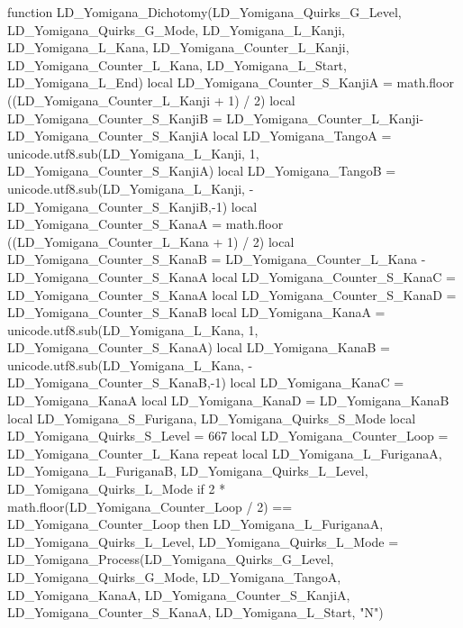{	function LD_Yomigana_Dichotomy(LD_Yomigana_Quirks_G_Level, LD_Yomigana_Quirks_G_Mode, LD_Yomigana_L_Kanji, LD_Yomigana_L_Kana, LD_Yomigana_Counter_L_Kanji, LD_Yomigana_Counter_L_Kana, LD_Yomigana_L_Start, LD_Yomigana_L_End)		
		local LD_Yomigana_Counter_S_KanjiA = math.floor ((LD_Yomigana_Counter_L_Kanji + 1) / 2)
		local LD_Yomigana_Counter_S_KanjiB = LD_Yomigana_Counter_L_Kanji-LD_Yomigana_Counter_S_KanjiA
		local LD_Yomigana_TangoA = unicode.utf8.sub(LD_Yomigana_L_Kanji, 1, LD_Yomigana_Counter_S_KanjiA)
		local LD_Yomigana_TangoB = unicode.utf8.sub(LD_Yomigana_L_Kanji, -LD_Yomigana_Counter_S_KanjiB,-1)
		local LD_Yomigana_Counter_S_KanaA = math.floor ((LD_Yomigana_Counter_L_Kana + 1) / 2)
		local LD_Yomigana_Counter_S_KanaB = LD_Yomigana_Counter_L_Kana - LD_Yomigana_Counter_S_KanaA
		local LD_Yomigana_Counter_S_KanaC = LD_Yomigana_Counter_S_KanaA
		local LD_Yomigana_Counter_S_KanaD = LD_Yomigana_Counter_S_KanaB
		local LD_Yomigana_KanaA = unicode.utf8.sub(LD_Yomigana_L_Kana, 1, LD_Yomigana_Counter_S_KanaA)
		local LD_Yomigana_KanaB = unicode.utf8.sub(LD_Yomigana_L_Kana, -LD_Yomigana_Counter_S_KanaB,-1)
		local LD_Yomigana_KanaC = LD_Yomigana_KanaA
		local LD_Yomigana_KanaD = LD_Yomigana_KanaB
		local LD_Yomigana_S_Furigana, LD_Yomigana_Quirks_S_Mode
		local LD_Yomigana_Quirks_S_Level = 667
		local LD_Yomigana_Counter_Loop = LD_Yomigana_Counter_L_Kana 
		repeat 
			local LD_Yomigana_L_FuriganaA, LD_Yomigana_L_FuriganaB, LD_Yomigana_Quirks_L_Level, LD_Yomigana_Quirks_L_Mode
			if 2 * math.floor(LD_Yomigana_Counter_Loop / 2) == LD_Yomigana_Counter_Loop then
				LD_Yomigana_L_FuriganaA, LD_Yomigana_Quirks_L_Level, LD_Yomigana_Quirks_L_Mode = LD_Yomigana_Process(LD_Yomigana_Quirks_G_Level, LD_Yomigana_Quirks_G_Mode, LD_Yomigana_TangoA, LD_Yomigana_KanaA, LD_Yomigana_Counter_S_KanjiA, LD_Yomigana_Counter_S_KanaA, LD_Yomigana_L_Start, "N") 
}
